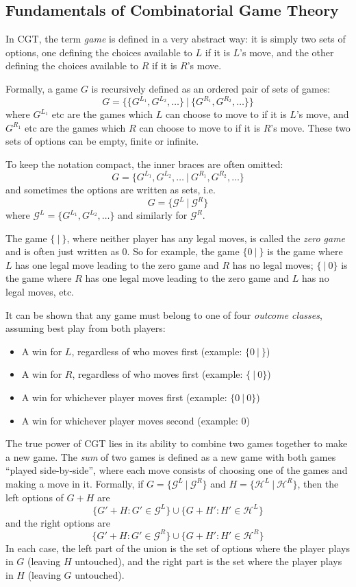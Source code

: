 \documentclass[a4paper,twocolumn]{article}
\newcommand{\cgtgame}[2]{\{#1 \:|\: #2\}}
\begin{document}
\subsection{Fundamentals of Combinatorial Game Theory}

In CGT, the term \emph{game} is defined in a very abstract way: it is
simply two sets of options, one defining the choices available to $L$
if it is $L$'s move, and the other defining the choices available to
$R$ if it is $R$'s move.

Formally, a game $G$ is recursively defined as an ordered pair of sets
of games: $$G = \cgtgame{\{G^{L_1}, G^{L_2}, \ldots\}}{\{G^{R_1},
  G^{R_2}, \ldots\}}$$ where $G^{L_1}$ etc are the games which $L$ can
choose to move to if it is $L$'s move, and $G^{R_1}$ etc are the games
which $R$ can choose to move to if it is $R$'s move. These two sets of
options can be empty, finite or infinite.

To keep the notation compact, the inner braces are often omitted:
$$G = \cgtgame{G^{L_1}, G^{L_2}, \ldots}{G^{R_1}, G^{R_2}, \ldots}$$
and sometimes the options are written as sets, i.e. $$G =
\cgtgame{\mathcal{G}^L}{\mathcal{G}^R}$$ where $\mathcal{G}^L =
\{G^{L_1}, G^{L_2}, \ldots\}$ and similarly for $\mathcal{G}^R$.

The game $\cgtgame{}{}$, where neither player has any legal moves, is
called the \emph{zero game} and is often just written as $0$. So for
example, the game $\cgtgame{0}{}$ is the game where $L$ has one legal
move leading to the zero game and $R$ has no legal moves;
$\cgtgame{}{0}$ is the game where $R$ has one legal move leading to
the zero game and $L$ has no legal moves, etc.

It can be shown that any game must belong to one of four \emph{outcome
  classes}, assuming best play from both players:

\begin{itemize}
  \item A win for $L$, regardless of who moves first (example:
    $\cgtgame{0}{}$)
  \item A win for $R$, regardless of who moves first (example:
    $\cgtgame{}{0}$)
  \item A win for whichever player moves first (example:
    $\cgtgame{0}{0}$)
  \item A win for whichever player moves second (example: $0$)
\end{itemize}

The true power of CGT lies in its ability to combine two games
together to make a new game. The \emph{sum} of two games is defined as
a new game with both games ``played side-by-side'', where each move
consists of choosing one of the games and making a move in
it. Formally, if $G = \cgtgame{\mathcal{G}^L}{\mathcal{G}^R}$ and $H =
\cgtgame{\mathcal{H}^L}{\mathcal{H}^R}$, then the left options of
$G+H$ are $$\{G'+H : G' \in \mathcal{G}^L\} \cup \{G+H' : H' \in
\mathcal{H}^L\}$$ and the right options are $$\{G'+H : G' \in
\mathcal{G}^R\} \cup \{G+H' : H' \in \mathcal{H}^R\}$$ In each case,
the left part of the union is the set of options where the player
plays in $G$ (leaving $H$ untouched), and the right part is the set
where the player plays in $H$ (leaving $G$ untouched).
\end{document}
